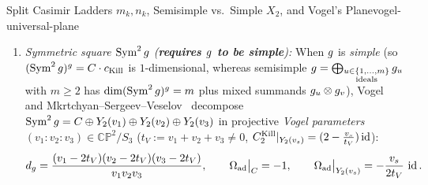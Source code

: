 \begin{zkmodule}{Split Casimir Ladders $m_k, n_k$, Semisimple vs.\ Simple $X_2$, and Vogel's Plane}{vogel-universal-plane}
\begin{enumerate}[leftmargin=*]
  \item \emph{Symmetric square $\operatorname{Sym}^2g$ (\textbf{requires $g$ to be simple}):} When $g$ is \emph{simple} (so $(\operatorname{Sym}^2g)^{g} = C\cdot c_{\mathrm{Kill}}$ is $1$-dimensional, whereas semisimple $g = \bigoplus_{\substack{u\in\{1,\dots,m\}\\\mathrm{ideals}}}g_u$ with $m \ge 2$ has $\dim(\operatorname{Sym}^2g)^{g} = m$ plus mixed summands $g_u\otimes g_v$), Vogel and Mkrtchyan--Sergeev--Veselov~\cite{MSV11} decompose $\operatorname{Sym}^2g = C\oplus Y_2(v_1)\oplus Y_2(v_2)\oplus Y_2(v_3)$ in projective \emph{Vogel parameters} $(v_1 : v_2 : v_3) \in \mathbb{CP}^2/S_3$ ($t_V := v_1 + v_2 + v_3 \neq 0$, $C_2^{\mathrm{Kill}}|_{Y_2(v_s)} = (2 - \frac{v_s}{t_V})\operatorname{id}$):
  \begin{equation}
  \label{eq:vogel-dim-and-eigen}
  d_{g} = \frac{(v_1 - 2t_V)(v_2 - 2t_V)(v_3 - 2t_V)}{v_1 v_2 v_3},\qquad
  \Omega_{\mathrm{ad}}\big|_{C} = -1,\qquad
  \Omega_{\mathrm{ad}}\big|_{Y_2(v_s)} = -\frac{v_s}{2t_V}\,\operatorname{id}.
  \end{equation}
\end{enumerate}
\end{zkmodule}

